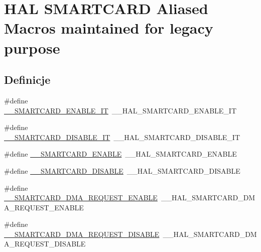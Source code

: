 \hypertarget{group___h_a_l___s_m_a_r_t_c_a_r_d___aliased___macros}{}\section{H\+AL S\+M\+A\+R\+T\+C\+A\+RD Aliased Macros maintained for legacy purpose}
\label{group___h_a_l___s_m_a_r_t_c_a_r_d___aliased___macros}
\subsection*{Definicje}
\begin{DoxyCompactItemize}
\item 
\#define \hyperlink{group___h_a_l___s_m_a_r_t_c_a_r_d___aliased___macros_ga8d5d23bc871cf5aef481120b55f7ac9f}{\+\_\+\+\_\+\+S\+M\+A\+R\+T\+C\+A\+R\+D\+\_\+\+E\+N\+A\+B\+L\+E\+\_\+\+IT}~\+\_\+\+\_\+\+H\+A\+L\+\_\+\+S\+M\+A\+R\+T\+C\+A\+R\+D\+\_\+\+E\+N\+A\+B\+L\+E\+\_\+\+IT
\item 
\#define \hyperlink{group___h_a_l___s_m_a_r_t_c_a_r_d___aliased___macros_ga86c309a6a3c0780c7847062466aaf4cc}{\+\_\+\+\_\+\+S\+M\+A\+R\+T\+C\+A\+R\+D\+\_\+\+D\+I\+S\+A\+B\+L\+E\+\_\+\+IT}~\+\_\+\+\_\+\+H\+A\+L\+\_\+\+S\+M\+A\+R\+T\+C\+A\+R\+D\+\_\+\+D\+I\+S\+A\+B\+L\+E\+\_\+\+IT
\item 
\#define \hyperlink{group___h_a_l___s_m_a_r_t_c_a_r_d___aliased___macros_gaa4e29e98414736502d7ee2371481d9f6}{\+\_\+\+\_\+\+S\+M\+A\+R\+T\+C\+A\+R\+D\+\_\+\+E\+N\+A\+B\+LE}~\+\_\+\+\_\+\+H\+A\+L\+\_\+\+S\+M\+A\+R\+T\+C\+A\+R\+D\+\_\+\+E\+N\+A\+B\+LE
\item 
\#define \hyperlink{group___h_a_l___s_m_a_r_t_c_a_r_d___aliased___macros_ga7765cb32d89b868ca5e775e7b6a571c7}{\+\_\+\+\_\+\+S\+M\+A\+R\+T\+C\+A\+R\+D\+\_\+\+D\+I\+S\+A\+B\+LE}~\+\_\+\+\_\+\+H\+A\+L\+\_\+\+S\+M\+A\+R\+T\+C\+A\+R\+D\+\_\+\+D\+I\+S\+A\+B\+LE
\item 
\#define \hyperlink{group___h_a_l___s_m_a_r_t_c_a_r_d___aliased___macros_ga758ec49e911579f65f7cb03e11cbf1b7}{\+\_\+\+\_\+\+S\+M\+A\+R\+T\+C\+A\+R\+D\+\_\+\+D\+M\+A\+\_\+\+R\+E\+Q\+U\+E\+S\+T\+\_\+\+E\+N\+A\+B\+LE}~\+\_\+\+\_\+\+H\+A\+L\+\_\+\+S\+M\+A\+R\+T\+C\+A\+R\+D\+\_\+\+D\+M\+A\+\_\+\+R\+E\+Q\+U\+E\+S\+T\+\_\+\+E\+N\+A\+B\+LE
\item 
\#define \hyperlink{group___h_a_l___s_m_a_r_t_c_a_r_d___aliased___macros_gac7fcc6baa98b300ea02656c79c48b2a9}{\+\_\+\+\_\+\+S\+M\+A\+R\+T\+C\+A\+R\+D\+\_\+\+D\+M\+A\+\_\+\+R\+E\+Q\+U\+E\+S\+T\+\_\+\+D\+I\+S\+A\+B\+LE}~\+\_\+\+\_\+\+H\+A\+L\+\_\+\+S\+M\+A\+R\+T\+C\+A\+R\+D\+\_\+\+D\+M\+A\+\_\+\+R\+E\+Q\+U\+E\+S\+T\+\_\+\+D\+I\+S\+A\+B\+LE

\end{DoxyCompactItemize}
